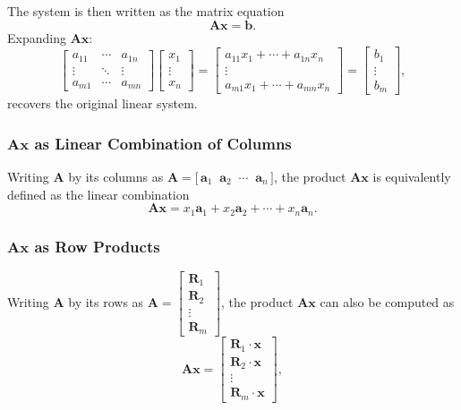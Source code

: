 The system is then written as the matrix equation
\[
  \mathbf{A}\mathbf{x} = \mathbf{b}.
\]
Expanding $\mathbf{A}\mathbf{x}$:
\[
  \begin{bmatrix}
    a_{11} & \cdots & a_{1n} \\
    \vdots & \ddots & \vdots \\
    a_{m1} & \cdots & a_{mn}
  \end{bmatrix}
  \begin{bmatrix}
    x_1 \\ \vdots \\ x_n
  \end{bmatrix}
  =
  \begin{bmatrix}
    a_{11}x_1 + \cdots + a_{1n}x_n \\
    \vdots                         \\
    a_{m1}x_1 + \cdots + a_{mn}x_n
  \end{bmatrix}
  =
  \begin{bmatrix}
    b_1 \\ \vdots \\ b_m
  \end{bmatrix}
  ,
\]
recovers the original linear system.

\subsubsection{$\mathbf{A}\mathbf{x}$ as Linear Combination of Columns}

Writing $\mathbf{A}$ by its columns as $\mathbf{A} = \bigl[\,\mathbf{a}_1 \;\; \mathbf{a}_2 \;\; \cdots \;\; \mathbf{a}_n\,\bigr]$, the product $\mathbf{A}\mathbf{x}$ is equivalently defined as the linear combination
\[
  \mathbf{A}\mathbf{x} = x_1 \mathbf{a}_1 + x_2 \mathbf{a}_2 + \cdots + x_n \mathbf{a}_n.
\]

\subsubsection{$\mathbf{A}\mathbf{x}$ as Row Products}

Writing $\mathbf{A}$ by its rows as
$\mathbf{A} =
  \begin{bmatrix}
    \mathbf{R}_1 \\ \mathbf{R}_2 \\ \vdots \\ \mathbf{R}_m
  \end{bmatrix}
$,
the product $\mathbf{A}\mathbf{x}$ can also be computed as
\[
  \mathbf{A}\mathbf{x}
  =
  \begin{bmatrix}
    \mathbf{R}_1 \cdot \mathbf{x} \\
    \mathbf{R}_2 \cdot \mathbf{x} \\
    \vdots                        \\
    \mathbf{R}_m \cdot \mathbf{x}
  \end{bmatrix}
  ,
\]

